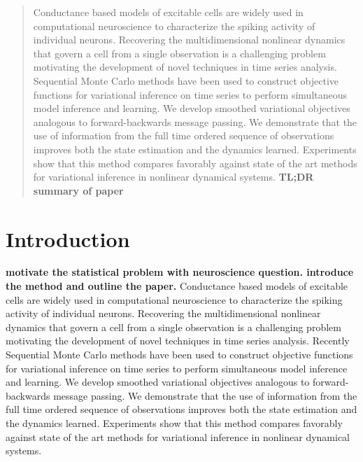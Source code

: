 \documentclass{article}
\begin{document}
\printAffiliationsAndNotice{\icmlEqualContribution} %

\begin{abstract}
Conductance based models of excitable cells are widely used in computational neuroscience to characterize the spiking activity of individual neurons. Recovering the multidimensional nonlinear dynamics that govern a cell from a single observation is a challenging problem motivating the development of novel techniques in time series analysis. Sequential Monte Carlo methods have been used to construct objective functions for variational inference on time series to perform simultaneous model inference and learning. We develop smoothed variational objectives analogous to forward-backwards message passing. We demonstrate that the use of information from the full time ordered sequence of observations improves both the state estimation and the dynamics learned. Experiments show that this method compares favorably against state of the art methods for variational inference in nonlinear dynamical systems. \textbf{TL;DR summary of paper}
\end{abstract}

\section{Introduction}
\label{submission}
\textbf{motivate the statistical problem with neuroscience question. introduce the method and outline the paper.}
Conductance based models of excitable cells are widely used in computational neuroscience to characterize the spiking activity of individual neurons. Recovering the multidimensional nonlinear dynamics that govern a cell from a single observation is a challenging problem motivating the development of novel techniques in time series analysis. Recently Sequential Monte Carlo methods have been used to construct objective functions for variational inference on time series to perform simultaneous model inference and learning. We develop smoothed variational objectives analogous to forward-backwards message passing. We demonstrate that the use of information from the full time ordered sequence of observations improves both the state estimation and the dynamics learned. Experiments show that this method compares favorably against state of the art methods for variational inference in nonlinear dynamical systems.
\end{document}
